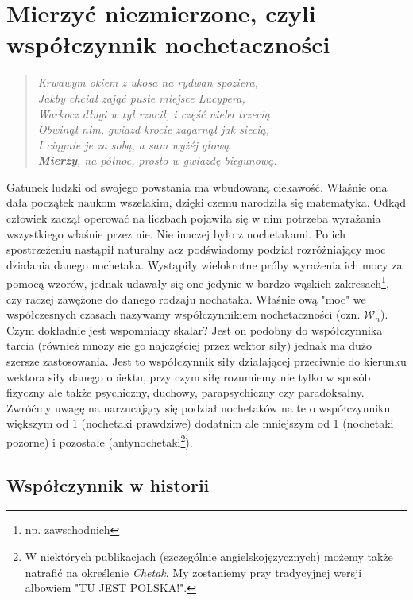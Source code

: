 \newcommand{\Wn}{$\mathscr{W}_n$}
\chapter{Mierzyć niezmierzone, czyli współczynnik nochetaczności}

\begin{quote}
\small
\itshape
Krwawym okiem z ukosa na rydwan spoziera, \\
Jakby chciał zająć puste miejsce Lucypera, \\
Warkocz długi w tył rzucił, i część nieba trzecią \\
Obwinął nim, gwiazd krocie zagarnął jak siecią, \\
I ciągnie je za sobą, a sam wyżéj głową \\
\textbf{Mierzy}, na północ, prosto w gwiazdę biegunową. 
\end{quote}

Gatunek ludzki od swojego powstania ma wbudowaną ciekawość. Właśnie ona dała początek naukom wszelakim, dzięki czemu narodziła się matematyka. Odkąd człowiek zaczął operować na liczbach pojawiła się w nim potrzeba wyrażania wszystkiego właśnie przez nie. Nie inaczej było z nochetakami. Po ich spostrzeżeniu nastąpił naturalny acz podświadomy podział rozróżniający moc działania danego nochetaka. Wystąpiły wielokrotne próby wyrażenia ich mocy za pomocą wzorów, jednak udawały się one jedynie w bardzo wąskich zakresach\footnote{np. zawschodnich}, czy raczej zawężone do danego rodzaju nochataka. Właśnie ową "moc" we współczesnych czasach nazywamy współczynnikiem nochetaczności (ozn. $\mathscr{W}_n$). 
Czym dokładnie jest wspomniany skalar? Jest on podobny do współczynnika tarcia (również mnoży sie go najczęściej przez wektor siły) jednak ma dużo szersze zastosowania. Jest to współczynnik siły działającej przeciwnie do kierunku wektora siły danego obiektu, przy czym siłę rozumiemy nie tylko w sposób fizyczny ale także psychiczny, duchowy, parapsychiczny czy paradoksalny. Zwróćmy uwagę na narzucający się podział nochetaków na te o współczynniku większym od 1 (nochetaki prawdziwe) dodatnim ale mniejszym od 1 (nochetaki pozorne) i pozostałe (antynochetaki\footnote{W niektórych publikacjach (szczególnie angielskojęzycznych) możemy także natrafić na określenie \textit{Chetak}. My zostaniemy przy tradycyjnej wersji albowiem "TU JEST POLSKA!".}). 

\section{Współczynnik w historii}


